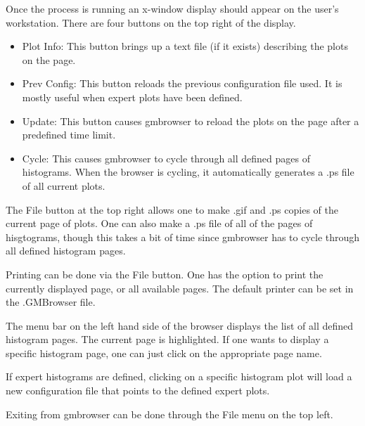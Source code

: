 \documentclass[12pt]{article}
\def\begi{\begin{itemize}}
\def\endi{\end{itemize}}
\begin{document}
Once the process is running an x-window display should appear
on the user's workstation. There are four buttons on the top
right of the display.
\begi
  \item Plot Info: This button brings up a text file (if it exists)
        describing the plots on the page.
  \item Prev Config: This button reloads the previous configuration file used.
        It is mostly useful when expert plots have been defined.
  \item Update: This button causes gmbrowser to reload the plots on the
        page after a predefined time limit.
  \item Cycle: This causes gmbrowser to cycle through all defined pages 
        of histograms. When the browser is cycling, it automatically
        generates a .ps file of all current plots.
\endi
The File button at the top right allows one to make .gif and .ps copies
of the current page of plots. One can also make a .ps file of all of the
pages of hisgtograms, though this takes a bit of time since gmbrowser has
to cycle through all defined histogram pages.

Printing can be done via the File button. One has the option to print
the currently displayed page, or all available pages. The default
printer can be set in the .GMBrowser file.

The menu bar on the left hand side of the browser displays the list of
all defined histogram pages. The current page is highlighted. If one
wants to display a specific histogram page, one can just click on the
appropriate page name.

If expert histograms are defined, clicking on a specific histogram
plot will load a new configuration file that points to the defined
expert plots.

Exiting from gmbrowser can be done through the File menu on the
top left.
\end{document}
